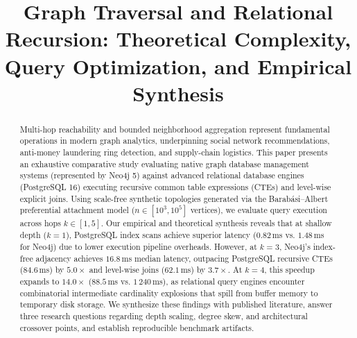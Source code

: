 \documentclass[conference,10pt]{IEEEtran}%
\begin{document}
\title{Graph Traversal and Relational Recursion: Theoretical Complexity, Query Optimization, and Empirical Synthesis}

\author{
}

\maketitle

\begin{abstract}
Multi-hop reachability and bounded neighborhood aggregation represent fundamental operations in modern graph analytics, underpinning social network recommendations, anti-money laundering ring detection, and supply-chain logistics. This paper presents an exhaustive comparative study evaluating native graph database management systems (represented by Neo4j 5) against advanced relational database engines (PostgreSQL 16) executing recursive common table expressions (CTEs) and level-wise explicit joins. Using scale-free synthetic topologies generated via the Barab\'asi--Albert preferential attachment model ($n \in [10^3, 10^5]$ vertices), we evaluate query execution across hops $k \in [1, 5]$. Our empirical and theoretical synthesis reveals that at shallow depth ($k=1$), PostgreSQL index scans achieve superior latency ($0.82$\,ms vs. $1.48$\,ms for Neo4j) due to lower execution pipeline overheads. However, at $k=3$, Neo4j's index-free adjacency achieves $16.8$\,ms median latency, outpacing PostgreSQL recursive CTEs ($84.6$\,ms) by $5.0\times$ and level-wise joins ($62.1$\,ms) by $3.7\times$. At $k=4$, this speedup expands to $14.0\times$ ($88.5$\,ms vs. $1\,240$\,ms), as relational query engines encounter combinatorial intermediate cardinality explosions that spill from buffer memory to temporary disk storage. We synthesize these findings with published literature, answer three research questions regarding depth scaling, degree skew, and architectural crossover points, and establish reproducible benchmark artifacts.
\end{abstract}
\end{document}
